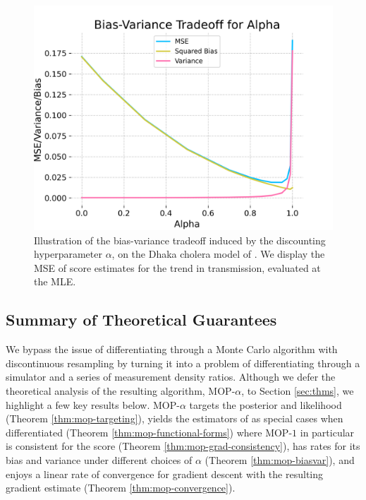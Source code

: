 \documentclass[9pt,twocolumn,twoside]{pnas-new}
\begin{document}
\begin{figure}[ht!]
    \centering
    \includegraphics[width=\textwidth/3]{../imgs/095/biasvar.png}
    \caption{Illustration of the bias-variance tradeoff induced by the discounting hyperparameter $\alpha$, on the Dhaka cholera model of \cite{king08}. We display the MSE of score estimates for the trend in transmission, evaluated at the MLE.}
    \label{fig:biasvar}
\end{figure}

\subsection{Summary of Theoretical Guarantees}

We bypass the issue of differentiating through a Monte Carlo algorithm with discontinuous resampling by turning it into a problem of differentiating through a simulator and a series of measurement density ratios. Although we defer the theoretical analysis of the resulting algorithm, MOP-$\alpha$, to Section \ref{sec:thms}, we highlight a few key results below. MOP-$\alpha$ targets the posterior and likelihood (Theorem \ref{thm:mop-targeting}), yields the estimators of \cite{poyiadjis11, scibior21, naesseth18} as special cases when differentiated (Theorem \ref{thm:mop-functional-forms}) where MOP-$1$ in particular is consistent for the score (Theorem \ref{thm:mop-grad-consistency}), has rates for its bias and variance under different choices of $\alpha$ (Theorem \ref{thm:mop-biasvar}), and enjoys a linear rate of convergence for gradient descent with the resulting gradient estimate (Theorem \ref{thm:mop-convergence}).  
\end{document}
